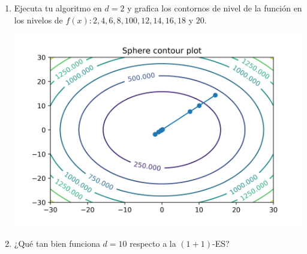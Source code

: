 \documentclass[10pt,letterpaper]{article}
\begin{document}
\begin{enumerate}
        \begin{enumerate}
            \item Ejecuta tu algoritmo en $d=2$ y grafica los contornos de nivel de
                la función en los nivelos de $f(x): 2, 4, 6, 8, 100, 12, 14, 16, 18$ y $20$.
                \begin{center}
                    \includegraphics[scale=.6]{./assets/ex3-a-sphere.png}
                \end{center}
            \item ¿Qué tan bien funciona $d=10$ respecto a la $(1+1)$-ES?
        \end{enumerate}
\end{enumerate}
\end{document}
